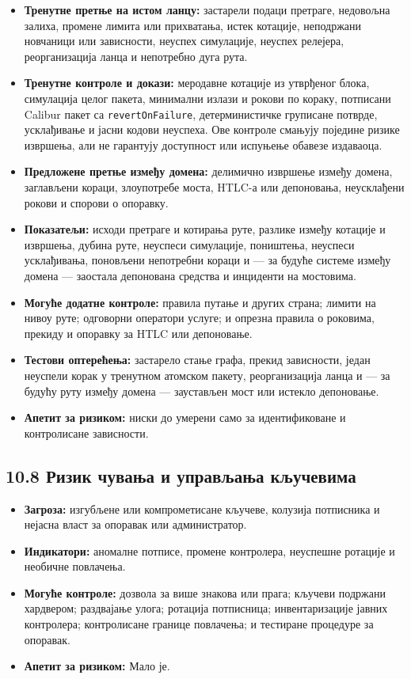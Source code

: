 \documentclass[11pt]{article}
\begin{document}
\begin{itemize}[leftmargin=*]
\item \textbf{Тренутне претње на истом ланцу:} застарели подаци претраге, недовољна залиха, промене лимита или прихватања, истек котације, неподржани новчаници или зависности, неуспех симулације, неуспех релејера, реорганизација ланца и непотребно дуга рута.
\item \textbf{Тренутне контроле и докази:} меродавне котације из утврђеног блока, симулација целог пакета, минимални излази и рокови по кораку, потписани Calibur пакет са \texttt{revertOnFailure}, детерминистичке груписане потврде, усклађивање и јасни кодови неуспеха. Ове контроле смањују поједине ризике извршења, али не гарантују доступност или испуњење обавезе издаваоца.
\item \textbf{Предложене претње између домена:} делимично извршење између домена, заглављени кораци, злоупотребе моста, HTLC-а или депоновања, неусклађени рокови и спорови о опоравку.
\item \textbf{Показатељи:} исходи претраге и котирања руте, разлике између котације и извршења, дубина руте, неуспеси симулације, поништења, неуспеси усклађивања, поновљени непотребни кораци и --- за будуће системе између домена --- заостала депонована средства и инциденти на мостовима.
\item \textbf{Могуће додатне контроле:} правила путање и других страна; лимити на нивоу руте; одговорни оператори услуге; и опрезна правила о роковима, прекиду и опоравку за HTLC или депоновање.
\item \textbf{Тестови оптерећења:} застарело стање графа, прекид зависности, један неуспели корак у тренутном атомском пакету, реорганизација ланца и --- за будућу руту између домена --- заустављен мост или истекло депоновање.
\item \textbf{Апетит за ризиком:} ниски до умерени само за идентификоване и контролисане зависности.
\end{itemize}
\subsection*{10.8 Ризик чувања и управљања кључевима}

\begin{itemize}[leftmargin=*]
\item \textbf{Загроза:} изгубљене или компрометисане кључеве, колузија потписника и нејасна власт за опоравак или администратор.
\item \textbf{Индикатори:} аномалне потписе, промене контролера, неуспешне ротације и необичне повлачења.
\item \textbf{Могуће контроле:} дозвола за више знакова или прага; кључеви подржани хардвером; раздвајање улога; ротација потписница; инвентаризације јавних контролера; контролисане границе повлачења; и тестиране процедуре за опоравак.
\item \textbf{Апетит за ризиком:} Мало је.
\end{itemize}
\end{document}
